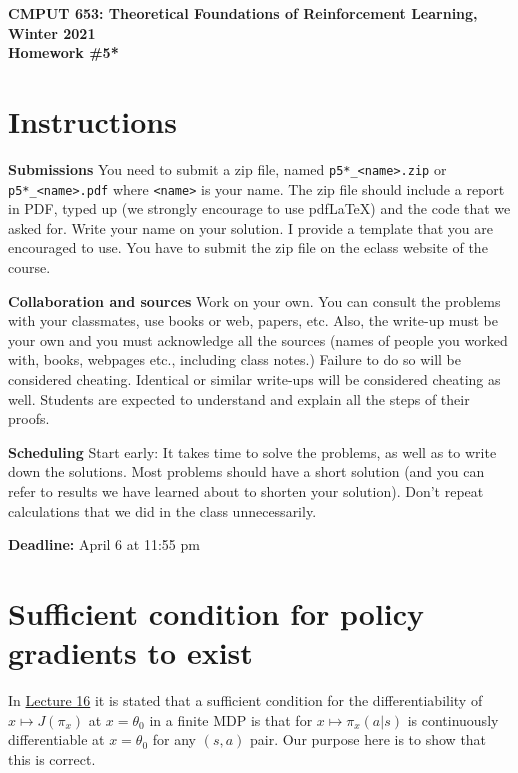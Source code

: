 \documentclass{article}
\newcommand{\hwnumber}{5*}
\DeclareMathOperator*{\1}{\mathbbm{1}}
\newcommand{\0}{\mathbf{0}}
\theoremstyle{definition}
\theoremstyle{remark}
\theoremstyle{theorem}
\begin{document}
\begin{center}
{\Large \textbf{CMPUT 653: Theoretical Foundations of Reinforcement Learning, Winter 2021\\ Homework \#\hwnumber}}
\end{center}

\section*{Instructions}
\textbf{Submissions}
You need to submit a zip file, named {\tt p\hwnumber\_<name>.zip} 
or {\tt p\hwnumber\_<name>.pdf} 
where {\tt <name>} is your name.
The zip file should include a report in PDF, typed up (we strongly encourage to use pdf\LaTeX) and the code that we asked for. Write your name on your solution.
I provide a template that you are encouraged to use.
You have to submit the zip file on the eclass website of the course.

\textbf{Collaboration and sources}
Work on your own. You can consult the problems with your classmates, use books
or web, papers, etc.
Also, the write-up must be your own and you must acknowledge all the
sources (names of people you worked with, books, webpages etc., including class notes.) 
Failure to do so will be considered cheating.  
Identical or similar write-ups will be considered cheating as well.
Students are expected to understand and explain all the steps of their proofs.

\textbf{Scheduling}
Start early: It takes time to solve the problems, as well as to write down the solutions. Most problems should have a short solution (and you can refer to results we have learned about to shorten your solution). Don't repeat calculations that we did in the class unnecessarily.

\vspace{0.3cm}

\textbf{Deadline:} April 6 at 11:55 pm

\newcommand{\cM}{\mathcal{M}}
\newcommand{\nS}{\mathrm{S}}
\newcommand{\nA}{\mathrm{A}}
\newcommand{\PP}{\mathbb{P}}
\newcommand{\RR}{\mathbb{R}}
\newcommand{\ip}[1]{\langle #1 \rangle}
\newcommand{\N}{\mathbb{N}}
\newcommand{\cG}{\mathcal{G}}
\newcommand{\cP}{\mathcal{P}}

\section*{Sufficient condition for policy gradients to exist}

In
\href{https://rltheory.github.io/lecture-notes/planning-in-mdps/lec16/}
{Lecture 16} 
it is stated that a sufficient condition for the differentiability of $x \mapsto J(\pi_x)$ at $x=\theta_0$ 
in a finite MDP 
is that for 
$x\mapsto \pi_x(a|s)$ is continuously differentiable at $x=\theta_0$ for any $(s,a)$ pair.
Our purpose here is to show that this is correct.
\end{document}
